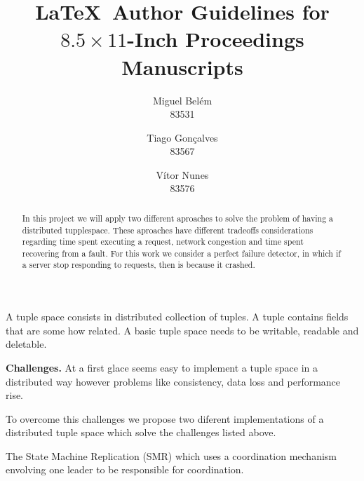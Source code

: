\documentclass[times, 10pt,twocolumn]{article}
\begin{document}
\title{\LaTeX\ Author Guidelines 
       for {\boldmath $8.5 \times 11$-Inch} Proceedings Manuscripts}

\author{Miguel Belém\\
83531\\
\and
Tiago Gonçalves\\
83567\\
\and
Vítor Nunes\\
83576\\
}

\maketitle
\thispagestyle{empty}

\begin{abstract}
   In this project we will apply two different aproaches to solve the problem of
   having a distributed tupplespace. 
   These aproaches have different tradeoffs considerations regarding time spent 
   executing a request, network congestion and time spent recovering from a fault.
   For this work we consider a perfect failure detector, in which if a server stop
   responding to requests, then is because it crashed.   
\end{abstract}




A tuple space consists in distributed collection of tuples. A tuple contains
fields that are some how related.
A basic tuple space needs to be writable, readable and deletable.

\textbf{Challenges.} At a first glace seems easy to implement a tuple space
in a distributed way however problems like consistency, data loss and 
performance rise.

To overcome this challenges we propose two diferent implementations of a 
distributed tuple space which solve the challenges listed above.

The State Machine Replication (SMR) which uses a coordination mechanism envolving
one leader to be responsible for coordination.
\end{document}
